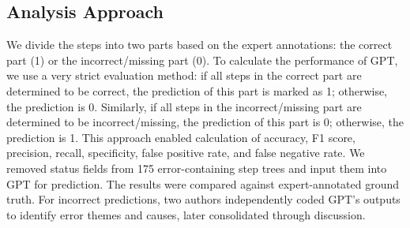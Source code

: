 \subsection{Analysis Approach} We divide the steps into two parts based on the expert annotations: the correct part (1) or the incorrect/missing part (0). To calculate the performance of GPT, we use a very strict evaluation method: if all steps in the correct part are determined to be correct, the prediction of this part is marked as 1; otherwise, the prediction is 0. Similarly, if all steps in the incorrect/missing part are determined to be incorrect/missing, the prediction of this part is 0; otherwise, the prediction is 1. This approach enabled calculation of accuracy, F1 score, precision, recall, specificity, false positive rate, and false negative rate.
We removed status fields from 175 error-containing step trees and input them into GPT for prediction. The results were compared against expert-annotated ground truth. For incorrect predictions, two authors independently coded GPT's outputs to identify error themes and causes, later consolidated through discussion.





